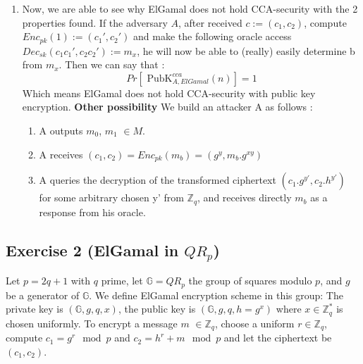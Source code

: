 \begin{solution}
\begin{enumerate}
    \item Now, we are able to see why ElGamal does not hold CCA-security with the 2 properties found. \newline
    If the adversary $A$, after received $c := (c_1, c_2)$, compute $Enc_{pk}(1) := (c_1', c_2')$ and make the following oracle access $Dec_{sk}(c_1c_1',c_2c_2') := m_x$, he will now be able to (really) easily determine b from $m_x$. Then we can say that :
    $$ Pr[\text{ PubK}^{cca}_{A, ElGamal}(n)] = 1$$
    Which means ElGamal does not hold CCA-security with public key encryption.
    \newline
    \textbf{Other possibility} \newline
    We build an attacker A as follows : 
    \begin{enumerate}
        \item A outputs $m_0$, $m_1$ $\in M$.
        \item A receives $(c_1,c_2)=Enc_{pk}(m_b)=(g^y,m_b.g^{xy})$
        \item A queries the decryption of the transformed ciphertext $(c_1.g^{y'},c_2.h^{y'})$ for some arbitrary chosen y' from $\mathbb{Z}_q$, and receives directly $m_b$ as a response from his oracle.
    \end{enumerate}
\end{enumerate}
\end{solution}

\subsection{Exercise 2 (ElGamal in \texorpdfstring{$QR_p$}{QRp})}
Let $p=2q+1$ with $q$ prime, let $\mathbb{G}=QR_p$ the group of squares modulo $p$, and $g$ be a generator of $\mathbb{G}$. 
We define ElGamal encryption scheme in this group: The private key is $(\mathbb{G},g,q,x)$, the public key is $(\mathbb{G},g,q,h=g^x)$
where $x \in \mathbb{Z}_{q}^*$ is chosen uniformly. To encrypt a message $m$ $\in \mathbb{Z}_{q}$, choose a uniform $r \in \mathbb{Z}_{q}$, compute $c_1=g^r \mod p$ and $c_2=h^r+m \mod p$ and let the ciphertext be $(c_1,c_2)$.

